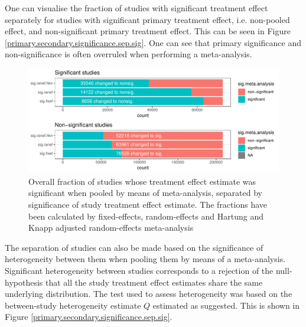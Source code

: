 \documentclass[11pt,a4paper,twoside]{book}\usepackage[]{graphicx}\usepackage[]{color}
\newenvironment{knitrout}{}{} %
\begin{document}
One can visualise the fraction of studies with significant treatment effect separately for studies with significant primary treatment effect, i.e. non-pooled effect, and non-significant primary treatment effect. This can be seen in Figure \ref{primary.secondary.significance.sep.sig}. One can see that primary significance and non-significance is often overruled when performing a meta-analysis.

\begin{figure}
\begin{knitrout}
\color{fgcolor}

{\centering \includegraphics[width=\textwidth-3cm]{figure/ch02_figunnamed-chunk-15-1} 

}



\end{knitrout}
\caption{Overall fraction of studies whose treatment effect estimate was significant when pooled by means of meta-analysis, separated by significance of study treatment effect estimate. The fractions have been calculated
by fixed-effects, random-effects and Hartung and Knapp adjusted random-effects meta-analysis}
\label{primary.secondary.significance}
\end{figure}

The separation of studies can also be made based on the significance of heterogeneity between them when pooling them by means of a meta-analysis. Significant heterogeneity between studies corresponds to a rejection of the null-hypothesis that all the study treatment effect estimates share the same underlying distribution. The test used to assess heterogeneity was based on the between-study heterogeneity estimate $Q$ estimated as \citet{tau.estimator} suggested. This is shown in Figure \ref{primary.secondary.significance.sep.sig}.
\end{document}
